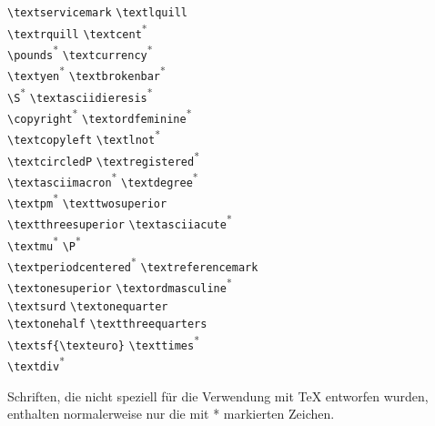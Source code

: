 {\begin{tabbing}
\textservicemark \> \lstinline+\textservicemark+ \> \textlquill \> \lstinline+\textlquill+\\
\textrquill \> \lstinline+\textrquill+ \> \textcent \> \lstinline+\textcent+\textsuperscript{*} \\
\textsterling \> \lstinline+\pounds+\textsuperscript{*}  \> \textcurrency \> \lstinline+\textcurrency+\textsuperscript{*} \\
\textyen \> \lstinline+\textyen+\textsuperscript{*} \> \textbrokenbar \> \lstinline+\textbrokenbar+\textsuperscript{*} \\
\textsection \> \lstinline+\S+\textsuperscript{*}  \> \textasciidieresis \> \lstinline+\textasciidieresis+\textsuperscript{*} \\
\textcopyright \> \lstinline+\copyright+\textsuperscript{*} \> \textordfeminine \> \lstinline+\textordfeminine+\textsuperscript{*} \\
\textcopyleft \> \lstinline+\textcopyleft+ \> \textlnot \> \lstinline+\textlnot+\textsuperscript{*} \\
\textcircledP \> \lstinline+\textcircledP+ \> \textregistered \> \lstinline+\textregistered+\textsuperscript{*} \\
\textasciimacron \> \lstinline+\textasciimacron+\textsuperscript{*}  \> \textdegree \> \lstinline+\textdegree+\textsuperscript{*} \\
\textpm \> \lstinline+\textpm+\textsuperscript{*} \> \texttwosuperior \> \lstinline+\texttwosuperior+\\
\textthreesuperior \> \lstinline+\textthreesuperior+ \> \textasciiacute \> \lstinline+\textasciiacute+\textsuperscript{*} \\
\textmu \> \lstinline+\textmu+\textsuperscript{*} \> \textparagraph \> \lstinline+\P+\textsuperscript{*} \\
\textperiodcentered \> \lstinline+\textperiodcentered+\textsuperscript{*} \> \textreferencemark \> \lstinline+\textreferencemark+\\
\textonesuperior \> \lstinline+\textonesuperior+ \> \textordmasculine \> \lstinline+\textordmasculine+\textsuperscript{*} \\
\textsurd \> \lstinline+\textsurd+ \> \textonequarter \> \lstinline+\textonequarter+\\
\textonehalf \> \lstinline+\textonehalf+ \> \textthreequarters \> \lstinline+\textthreequarters+\\
\textsf{\texteuro} \> \lstinline+\textsf{\texteuro}+ \> \texttimes \> \lstinline+\texttimes+\textsuperscript{*} \\
\textdiv \> \lstinline+\textdiv+\textsuperscript{*} \\
\end{tabbing}
}

{\footnotesize\noindent 
Schriften, die nicht speziell für die Verwendung mit
\TeX{} entworfen wurden, enthalten normalerweise nur die mit * markierten Zeichen.
\par}


\endinput
